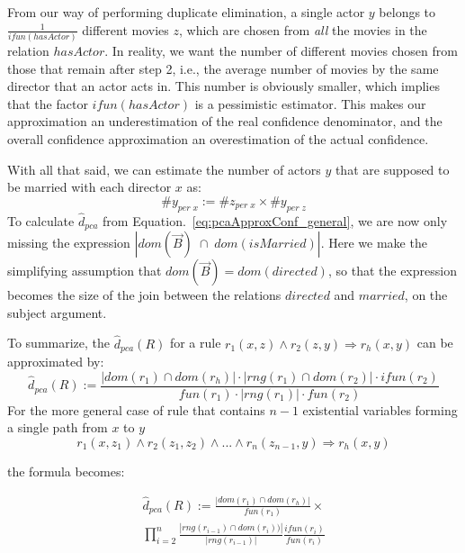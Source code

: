 {From our way of performing duplicate elimination, a single actor $y$ belongs to $\frac{1}{ifun(hasActor)}$ different movies $z$, 
which are chosen from \emph{all} the movies in the relation $hasActor$.
In reality, we want the number of different movies chosen from those that remain after step 2, %
i.e., the average number of movies by the same director that an actor acts in. This number is obviously smaller, which
implies that the factor $ifun(hasActor)$ is a pessimistic estimator. This makes 
our approximation an underestimation of the real confidence denominator, 
and the overall confidence approximation an overestimation of the actual confidence.

With all that said, we can estimate the number of actors $y$ that are supposed to be married with each director $x$ as:
$$
 \#y_{per\;x} :=  \#z_{per \; x} \times \#y_{ per \; z}
$$
\noindent To calculate $\widehat{d}_{pca}$ from Equation.~\ref{eq:pcaApproxConf_general}, we are now only missing 
the expression $|dom(\vec{B})\;\cap\;dom(isMarried)|$. 
Here we make the simplifying assumption that $dom(\vec{B}) = dom(directed)$, so that the expression
becomes the size of the join between the relations $directed$ and $married$, on the subject argument.

To summarize, the $ \widehat{d}_{pca}(R)$ for a rule $r_1(x,z)\wedge r_2(z,y) \Rightarrow r_h(x,y)$ can be approximated by:
\[
  \widehat{d}_{pca}(R) := \frac{|dom(r_1) \cap dom(r_h)| \cdot |rng(r_1) \cap dom(r_2)| \cdot ifun(r_2)  }{fun(r_1) \cdot |rng(r_1)| \cdot fun(r_2)}
\]
For the more general case of rule that contains $n-1$ existential variables forming a single path from $x$ to $y$
$$
  r_1(x,z_1) \wedge r_2(z_1,z_2) \wedge ... \wedge r_n(z_{n-1},y) \Rightarrow r_h(x,y)
$$

\noindent the formula becomes:

\begin{eqnarray*}
  \widehat{d}_{pca}(R) := \frac{|dom(r_1) \cap dom(r_h)|}{fun(r_1)}  \times \\
  \prod_{i=2}^{n}\frac{|rng(r_{i-1})\cap dom(r_i))|}{|rng(r_{i-1})|}\frac{ifun(r_i)}{fun(r_i)}
\end{eqnarray*}

}

